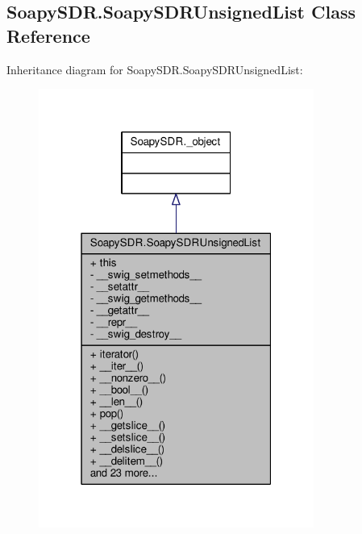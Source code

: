 \subsection{Soapy\+S\+D\+R.\+Soapy\+S\+D\+R\+Unsigned\+List Class Reference}
\label{classSoapySDR_1_1SoapySDRUnsignedList}


Inheritance diagram for Soapy\+S\+D\+R.\+Soapy\+S\+D\+R\+Unsigned\+List\+:
\nopagebreak
\begin{figure}[H]
\begin{center}
\leavevmode
\includegraphics[width=256pt]{d4/df0/classSoapySDR_1_1SoapySDRUnsignedList__inherit__graph}
\end{center}
\end{figure}


